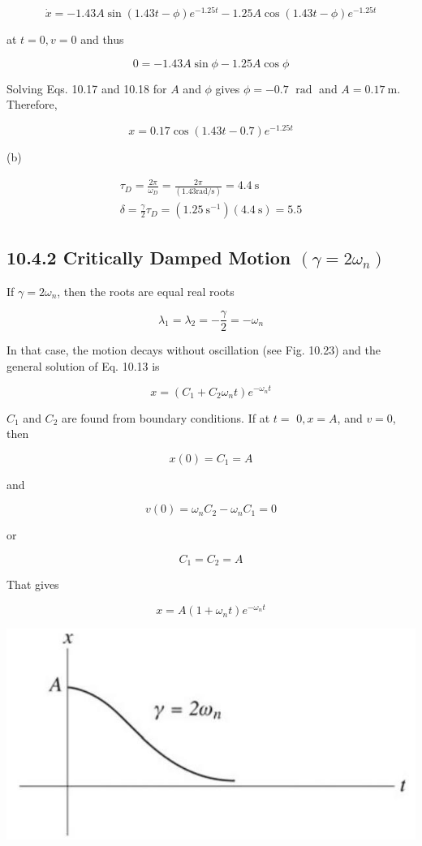 \documentclass[10pt]{article}
\begin{document}
$$
\dot{x}=-1.43 A \sin (1.43 t-\phi) e^{-1.25 t}-1.25 A \cos (1.43 t-\phi) e^{-1.25 t}
$$

at $t=0, v=0$ and thus


\begin{equation*}
0=-1.43 A \sin \phi-1.25 A \cos \phi \tag{10.18}
\end{equation*}


Solving Eqs. 10.17 and 10.18 for $A$ and $\phi$ gives $\phi=-0.7$ $\operatorname{rad}$ and $A=0.17 \mathrm{~m}$. Therefore,

$$
x=0.17 \cos (1.43 t-0.7) e^{-1.25 t}
$$

(b)

$$
\begin{gathered}
\tau_{D}=\frac{2 \pi}{\omega_{D}}=\frac{2 \pi}{(1.43 \mathrm{rad} / \mathrm{s})}=4.4 \mathrm{~s} \\
\delta=\frac{\gamma}{2} \tau_{D}=\left(1.25 \mathrm{~s}^{-1}\right)(4.4 \mathrm{~s})=5.5
\end{gathered}
$$

\subsection*{10.4.2 Critically Damped Motion $\left(\gamma=2 \omega_{n}\right)$}
If $\gamma=2 \omega_{n}$, then the roots are equal real roots

$$
\lambda_{1}=\lambda_{2}=-\frac{\gamma}{2}=-\omega_{n}
$$

In that case, the motion decays without oscillation (see Fig. 10.23) and the general solution of Eq. 10.13 is

$$
x=\left(C_{1}+C_{2} \omega_{n} t\right) e^{-\omega_{n} t}
$$

$C_{1}$ and $C_{2}$ are found from boundary conditions. If at $t=$ $0, x=A$, and $v=0$, then

$$
x(0)=C_{1}=A
$$

and

$$
v(0)=\omega_{n} C_{2}-\omega_{n} C_{1}=0
$$

or

$$
C_{1}=C_{2}=A
$$

That gives

$$
x=A\left(1+\omega_{n} t\right) e^{-\omega_{n} t}
$$

\begin{center}
\includegraphics[max width=\textwidth]{2024_09_13_db1f357d2aad0a03eb2eg-175(1)}
\end{center}
\end{document}
